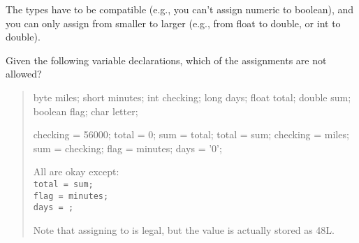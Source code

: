 \vspace{-1em}
\begin{answer}
The types have to be compatible (e.g., you can't assign numeric to boolean), and you can only assign from smaller to larger (e.g., from float to double, or int to double).
\end{answer}


\Q Given the following variable declarations, which of the assignments are not allowed?

\begin{quote}
\begin{multicols}{3}

\begin{javalst}
byte miles;
short minutes;
int checking;
long days;
float total;
double sum;
boolean flag;
char letter;
\end{javalst}

\columnbreak

\begin{javalst}
checking = 56000;
total = 0;
sum = total;
total = sum;
checking = miles;
sum = checking;
flag = minutes;
days = '0';
\end{javalst}

\columnbreak

\begin{answer}[10em]
All are okay except:
\\ \hspace*{1em} \texttt{total = sum;}
\\ \hspace*{1em} \texttt{flag = minutes;}
\\ \hspace*{1em} \texttt{days = ;}

\medskip
Note that assigning  to  is legal,
but the value is actually stored as 48L.
\end{answer}

\end{multicols}
\end{quote}


%
